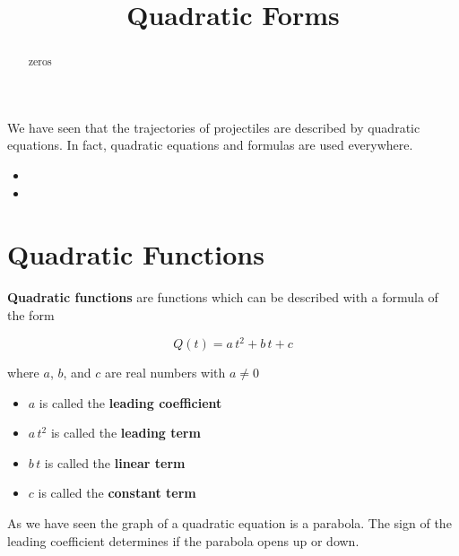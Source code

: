 \documentclass{ximera}
\title{Quadratic Forms}
\begin{document}
\begin{abstract}
zeros
\end{abstract}
\maketitle



We have seen that the trajectories of projectiles are described by quadratic equations.  In fact, quadratic equations and formulas are used everywhere.


\begin{itemize}
\item {}
\item {}
\end{itemize}







\section{Quadratic Functions}


\begin{definition}
\textbf{Quadratic functions} are functions which can be described with a formula of the form

\[  Q(t) = a \, t^2 + b \, t + c  \]

where $a$, $b$, and $c$ are real numbers with $a \ne 0$



\begin{itemize}
\item $a$ is called the \textbf{leading coefficient} 
\item $a \, t^2$ is called the \textbf{leading term} 
\item $b \, t$ is called the \textbf{linear term} 
\item $c$ is called the \textbf{constant term} 
\end{itemize}

\end{definition}




As we have seen the graph of a quadratic equation is a parabola. The sign of the leading coefficient determines if the parabola opens up or down.
\end{document}
